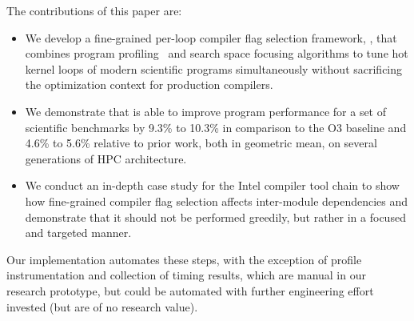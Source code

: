 The contributions of this paper are:
\begin{itemize}
\item We develop a fine-grained per-loop compiler flag selection
  framework, \toolname, that combines program profiling~\cite{caliper}
  and search space focusing algorithms to tune hot kernel loops of
  modern scientific programs simultaneously without sacrificing the
  optimization context for production compilers.
\item We demonstrate that \toolname is able to improve program
  performance for a set of scientific benchmarks by 9.3\% to 10.3\% in
  comparison to the O3 baseline and 4.6\% to 5.6\% relative to prior work,
  both in geometric mean, on several generations of HPC architecture.
%
\item We conduct an in-depth case study for the Intel compiler tool chain to
  show how fine-grained compiler
  flag selection affects inter-module dependencies and demonstrate
  that it should not be performed greedily, but rather in a focused and targeted manner.
\end{itemize}

Our \toolname implementation automates these steps, with the
exception of profile instrumentation and collection of timing results,
which are manual in our research prototype, but could be automated
with further engineering effort invested (but are of no research value).

